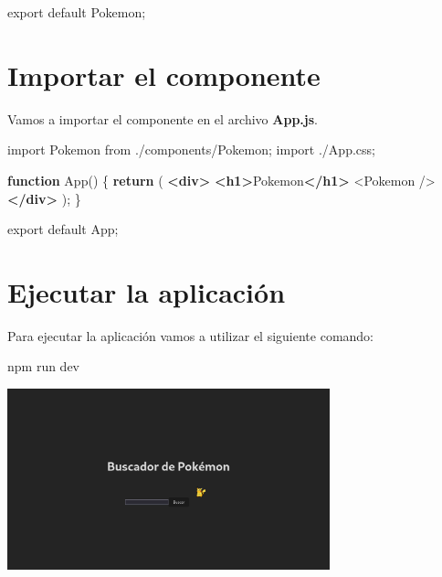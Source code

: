\documentclass[
  a4paper,
  DIV=11,
  numbers=noendperiod,
  onepage,
  openany]{scrreprt}
\newenvironment{Shaded}{\begin{snugshade}}{\end{snugshade}}
\newcommand{\ControlFlowTok}[1]{\textcolor[rgb]{0.00,0.23,0.31}{\textbf{#1}}}
\newcommand{\ExtensionTok}[1]{\textcolor[rgb]{0.00,0.23,0.31}{#1}}
\newcommand{\FunctionTok}[1]{\textcolor[rgb]{0.28,0.35,0.67}{#1}}
\newcommand{\ImportTok}[1]{\textcolor[rgb]{0.00,0.46,0.62}{#1}}
\newcommand{\KeywordTok}[1]{\textcolor[rgb]{0.00,0.23,0.31}{\textbf{#1}}}
\newcommand{\NormalTok}[1]{\textcolor[rgb]{0.00,0.23,0.31}{#1}}
\newcommand{\OperatorTok}[1]{\textcolor[rgb]{0.37,0.37,0.37}{#1}}
\newcommand{\StringTok}[1]{\textcolor[rgb]{0.13,0.47,0.30}{#1}}
\begin{document}
\begin{tcolorbox}
\begin{Shaded}
\begin{Highlighting}[]
\ImportTok{export} \ImportTok{default}\NormalTok{ Pokemon}\OperatorTok{;}
\end{Highlighting}
\end{Shaded}

\section{Importar el componente}\label{importar-el-componente}

Vamos a importar el componente en el archivo \textbf{App.js}.

\begin{Shaded}
\begin{Highlighting}[]
\ImportTok{import}\NormalTok{ Pokemon }\ImportTok{from} \StringTok{\textquotesingle{}./components/Pokemon\textquotesingle{}}\OperatorTok{;}
\ImportTok{import} \StringTok{\textquotesingle{}./App.css\textquotesingle{}}\OperatorTok{;}

\KeywordTok{function} \FunctionTok{App}\NormalTok{() \{}
  \ControlFlowTok{return}\NormalTok{ (}
    \KeywordTok{\textless{}div\textgreater{}}
      \KeywordTok{\textless{}h1\textgreater{}}\NormalTok{Pokemon}\KeywordTok{\textless{}/h1\textgreater{}}
      \FunctionTok{\textless{}Pokemon} \FunctionTok{/\textgreater{}}
    \KeywordTok{\textless{}/div\textgreater{}}
\NormalTok{  )}\OperatorTok{;}
\NormalTok{\}}

\ImportTok{export} \ImportTok{default}\NormalTok{ App}\OperatorTok{;}
\end{Highlighting}
\end{Shaded}

\section{Ejecutar la aplicación}\label{ejecutar-la-aplicaciuxf3n-1}

Para ejecutar la aplicación vamos a utilizar el siguiente comando:

\begin{Shaded}
\begin{Highlighting}[]
\ExtensionTok{npm}\NormalTok{ run dev}
\end{Highlighting}
\end{Shaded}

\includegraphics[width=0.7\textwidth,height=\textheight]{unidades/unidad6/images/paste-1.png}


\end{tcolorbox}
\end{document}
